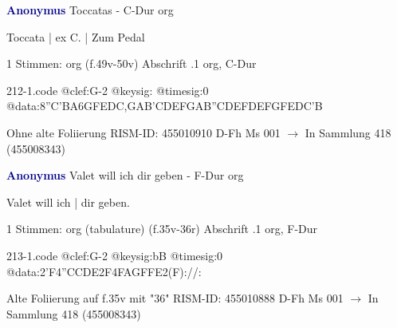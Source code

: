 \documentclass[twocolumn]{book}
\begin{document}
\newline \par \vspace{7pt} \textcolor{darkblue}{\textbf{Anonymus  }}
\newline Toccatas - C-Dur
\newline org
\newline \begin{itshape}[f.49v, at left:] Toccata | ex C. | Zum Pedal\end{itshape} 
\newline \textcolor{darkblue}{}  1 Stimmen: org  (f.49v-50v)
\newline Abschrift
.1  org, C-Dur  
\begin{filecontents*}{212-1.code}
@clef:G-2
@keysig:
@timesig:0
@data:8''C{'BA}{6GFED}{C,GAB}{'CDEF}{GAB''C}{DEFD}{EFGF}{EDC'B}
\end{filecontents*}
\newline
%
\newline Ohne alte Foliierung
\newline RISM-ID: 455010910
\newline D-Fh  Ms 001
\newline $\rightarrow$ In Sammlung 418 (455008343)
      
\newline \par \vspace{7pt} \textcolor{darkblue}{\textbf{Anonymus  }}
\newline Valet will ich dir geben - F-Dur
\newline org
\newline \begin{itshape}[f.35v, at left:] Valet will ich | dir geben.\end{itshape} 
\newline \textcolor{darkblue}{}  1 Stimmen: org (tabulature)  (f.35v-36r)
\newline Abschrift
.1  org, F-Dur  
\begin{filecontents*}{213-1.code}
@clef:G-2
@keysig:bB
@timesig:0
@data:2'F4''CCDE2F4FAGFFE2(F)://:
\end{filecontents*}
\newline
%
\newline Alte Foliierung auf f.35v mit "36"
\newline RISM-ID: 455010888
\newline D-Fh  Ms 001
\newline $\rightarrow$ In Sammlung 418 (455008343)
      
\end{document}
